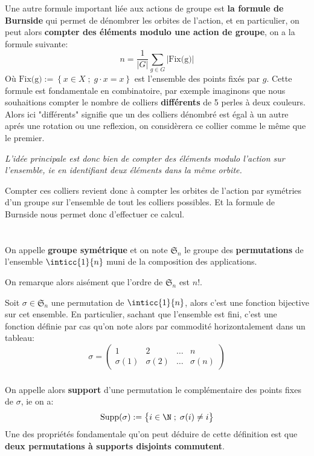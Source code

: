 \subsection*{}
Une autre formule important liée aux actions de groupe est \textbf{la formule de Burnside} qui permet de dénombrer les orbites de l'action, et en particulier, on peut alors \textbf{compter des éléments modulo une action de groupe}, on a la formule suivante:
\[ 
   n = \frac{1}{|G|} \sum_{g \in G} |\text{Fix(g)}| 
\]
Où \( \text{Fix(g)} := \left\{x \in X \; ; \; g \cdot x = x \right\}\) est l'ensemble des points fixés par \( g \). Cette formule est fondamentale en combinatoire, par exemple imaginons que nous souhaitions compter le nombre de colliers \textbf{différents} de 5 perles à deux couleurs. Alors ici "différents" signifie que un des colliers dénombré est égal à un autre aprés une rotation ou une reflexion, on considèrera ce collier comme le même que le premier. 
\begin{center}
   \textit{L'idée principale est donc bien de compter des éléments modulo l'action sur l'ensemble, ie en identifiant deux éléments dans la même orbite.}
\end{center}
Compter ces colliers revient donc à compter les orbites de l'action par symétries d'un groupe sur l'ensemble de tout les colliers possibles. Et la formule de Burnside nous permet donc d'effectuer ce calcul.
\chapter*{}
On appelle \textbf{groupe symétrique} et on note \(\mathfrak{S}_n\) le groupe des \textbf{permutations} de l'ensemble \(\inticc{1}{n}\) muni de la composition des applications.\<

On remarque alors aisément que l'ordre de \(\mathfrak{S}_n\) est \(n!\).\<

Soit \(\sigma \in \mathfrak{S}_n\) une permutation de \(\inticc{1}{n}\), alors c'est une fonction bijective sur cet ensemble. En particulier, sachant que l'ensemble est fini, c'est une fonction définie par cas qu'on note alors par commodité horizontalement dans un tableau:
\[
   \sigma =  \begin{pmatrix}
      1 & 2 & \ldots & n\\
      \sigma(1) & \sigma(2) & \ldots & \sigma(n)
   \end{pmatrix}
\]
\subsection*{}
On appelle alors \textbf{support} d'une permutation le complémentaire des points fixes de \(\sigma\), ie on a:
\[
   \text{Supp}(\sigma) := \bigl\{ i \in \N \; ; \; \sigma(i) \neq i \bigl\}   
\]
Une des propriétés fondamentale qu'on peut déduire de cette définition est que \textbf{deux permutations à supports disjoints commutent}.

